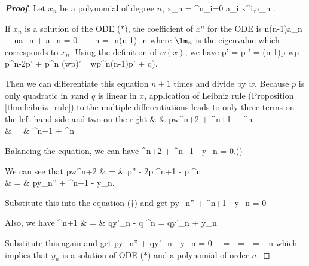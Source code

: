 \begin{proof}[\bf Proof]
Let $x_n$ be a polynomial of degree $n$,
\be
x_n = \sum^n_{i=0} a_i x^i,\quad a_n .
\ee

If $x_n$ is a solution of the ODE ($*$), the coefficient of $x^n$ for the ODE is
\be
n(n-1)\alpha a_n + n\mu a_n + \lm a_n = 0 \ \ra\ \lm_n = -n(n-1)\alpha - n\mu
\ee
where $\lm_n$ is the eigenvalue which corresponds to $x_n$. %
%
Using the definition of $w(x)$, we have
\be
p' = p ' = (n-1)p wp p^{n-2}p' + p^n (wp)' =wp^n(n-1)p' + q). %
\ee

Then we can differentiate this equation $n+1$ times and divide by $w$. Because $p$ is only quadratic in $x$and $q$ is linear in $x$, application of Leibniz rule (Proposition \ref{thm:leibniz_rule}) to the multiple differentiations leads to only three terms on the left-hand side and two on the right
\beast
& & \frac pw^{n+2} +   ^{n+1} + ^{n}\\
& = & ^{n+1} + ^{n}
\eeast

Balancing the equation, we can have
\be
{} ^{n+2} +  ^{n+1} - y_n = 0.\qquad (\dag)
\ee

We can see that
\beast
\frac pw^{n+2} & = & p'' - 2p  ^{n+1} - p ^{n} \\
& = & py_n'' + ^{n+1} - y_n.
\eeast

Substitute this into the equation ($\dag$) and get
\be
py_n'' + ^{n+1} - y_n = 0
\ee

Also, we have 
\beast
{}^{n+1} & = & qy'_n - q ^{n} = qy'_n + y_n
\eeast

Substitute this again and get
\be
py_n'' + qy'_n - y_n = 0 \ \ra\ \lm = -  = -  = \lm_n
\ee
which implies that $y_n$ is a solution of ODE ($*$) and a polynomial of order $n$.
\end{proof}


